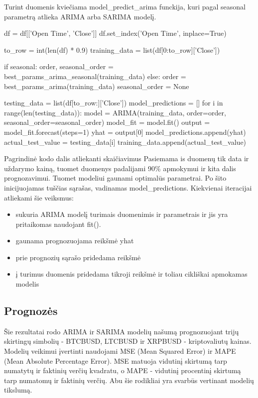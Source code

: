 \documentclass{VUMIFInfKursinis}
\begin{document}
Turint duomenis kviečiama model\_predict\_arima funckija, kuri pagal seasonal parametrą atlieka ARIMA arba SARIMA modelį.

\begin{python}
  df = df[['Open Time', 'Close']]
  df.set_index('Open Time', inplace=True)
  
  to_row = int(len(df) * 0.9)
  training_data = list(df[0:to_row]['Close'])
  
  if seasonal:
  	order, seasonal_order = best_params_arima_seasonal(training_data)
  else:
  	order = best_params_arima(training_data)
  	seasonal_order = None
  
  testing_data = list(df[to_row:]['Close'])
  model_predictions = []
  for i in range(len(testing_data)):
  	model = ARIMA(training_data, order=order, seasonal_order=seasonal_order)
  	model_fit = model.fit()
  	output = model_fit.forecast(steps=1)
  	yhat = output[0]
  	model_predictions.append(yhat)
  	actual_test_value = testing_data[i]
  	training_data.append(actual_test_value)
\end{python}

Pagrindinė kodo dalis atliekanti skaičiavimus
Pasiemama is duomenų tik data ir uždarymo kainą, tuomet duomenys padalijami 90\% apmokymui ir kita dalis prognozavimui. Tuomet modeliui gaunami 
optimalūs parametrai. Po šito inicijuojamas tuščias sąrašas, vadinamas model\_predictions. Kiekvienai iteracijai atliekami šie veiksmus:

\begin{itemize}
  \item sukuria ARIMA modelį turimais duomenimis ir parametrais ir jis yra pritaikomas naudojant fit().
  \item gaunama prognozuojama reikšmė yhat
  \item prie prognozių sąrašo pridedama reikšmė
  \item į turimus duomenis pridedama tikroji reikšmė ir toliau cikliškai apmokamas modelis
\end{itemize}

\subsection{Prognozės}

Šie rezultatai rodo ARIMA ir SARIMA modelių našumą prognozuojant trijų skirtingų simbolių - BTCBUSD, LTCBUSD ir XRPBUSD - kriptovaliutų kainas.
Modelių veikimui įvertinti naudojami MSE (Mean Squared Error) ir MAPE (Mean Absolute Percentage Error). 
MSE matuoja vidutinį skirtumą tarp numatytų ir faktinių verčių kvadratu, o MAPE - vidutinį procentinį skirtumą tarp numatomų ir faktinių verčių. 
Abu šie rodikliai yra svarbūs vertinant modelių tikslumą.
\end{document}
